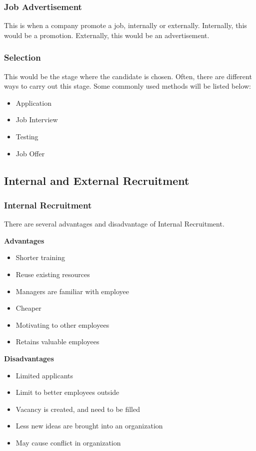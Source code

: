 \documentclass{standalone}
\begin{document}
\subsubsection{Job Advertisement}
This is when a company promote a job, internally or externally.
Internally, this would be a promotion.
Externally, this would be an advertisement.

\subsubsection{Selection}
This would be the stage where the candidate is chosen.
Often, there are different ways to carry out this stage.
Some commonly used methods will be listed below:
\begin{itemize}
	\item Application
	\item Job Interview
	\item Testing
	\item Job Offer
\end{itemize}

\subsection{Internal and External Recruitment}

\subsubsection{Internal Recruitment}
There are several advantages and disadvantage of Internal Recruitment.

\textbf{Advantages}\\
\begin{itemize}
	\item Shorter training
	\item Reuse existing resources
	\item Managers are familiar with employee
	\item Cheaper
	\item Motivating to other employees
	\item Retains valuable employees
\end{itemize}

\textbf{Disadvantages}\\
\begin{itemize}
	\item Limited applicants
	\item Limit to better employees outside
	\item Vacancy is created, and need to be filled
	\item Less new ideas are brought into an organization
	\item May cause conflict in organization
\end{itemize}
\end{document}
